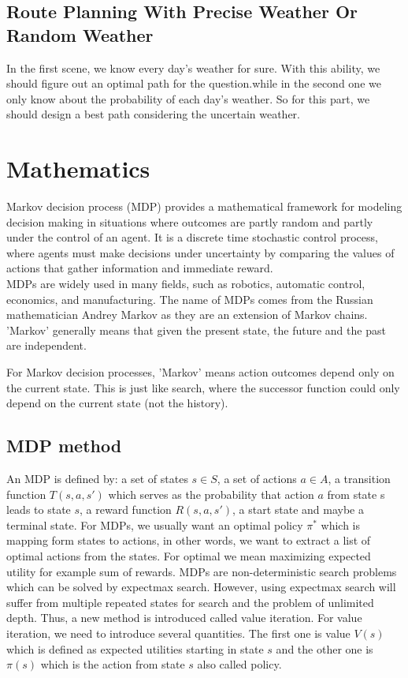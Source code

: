 \documentclass[10pt,twocolumn,letterpaper]{article}
\begin{document}
\subsection{Route Planning With Precise Weather Or Random Weather}

In the first scene, we know every day's weather for sure. With this ability, we should
figure out an optimal path for the question.while in the second one we only know about the probability of each day's weather.
So for this part, we should design a best path considering the uncertain weather.

\section{Mathematics}
Markov decision process (MDP) provides a mathematical framework for modeling decision 
making in situations where outcomes are partly random and partly under the control of 
an agent. It is a discrete time stochastic control process, where agents must make 
decisions under uncertainty by comparing the values of actions that gather information 
and immediate reward. 
\\MDPs are widely used in many fields, such as robotics, automatic control, economics, 
and manufacturing. The name of MDPs comes from the Russian mathematician Andrey Markov 
as they are an extension of Markov chains. 'Markov' generally means that given the 
present state, the future and the past are independent. 

For Markov decision processes, 'Markov' means action outcomes depend 
only on the current state. This is just like search, where the successor 
function could only depend on the current state (not the history).

\subsection{MDP method}
An MDP is defined by: a set of states $s \in S$, a set of actions $a \in A$,
a transition function $T(s, a, s')$ which serves as the probability that action $a$ 
from state s leads to state $s$, a reward function $R(s, a, s')$, a start state 
and maybe a terminal state. For MDPs, we usually want an optimal policy $\pi^* $ 
which is mapping form states to actions, in other words, we want to extract a list 
of optimal actions from the states. For optimal we mean maximizing expected utility 
for example sum of rewards. MDPs are non-deterministic search problems which can be 
solved by expectmax search. However, using expectmax search will suffer from multiple 
repeated states for search and the problem of unlimited depth. Thus, a new 
method is introduced called value iteration. For value iteration, we need 
to introduce several quantities. The first one is value $V(s)$ which is defined as 
expected utilities starting in state $s$ and the other one is $\pi (s)$ which is the action from state $s $
also called policy. 
\end{document}

